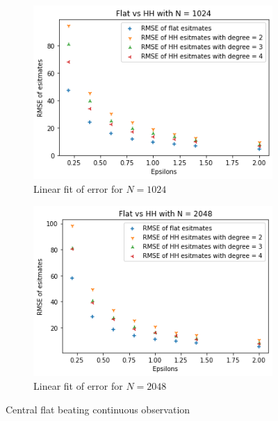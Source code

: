 \documentclass[11pt]{article}
\theoremstyle{definition}
\begin{document}
\begin{figure}[H]
\begin{subfigure}{.4\textwidth}
  \includegraphics[width=\linewidth]{figures/central_flat_hh/flat_beat_hh_N=1024.png}
  \caption{Linear fit of error for $N=1024$}
  \label{fig:14}
\end{subfigure}
\begin{subfigure}{.4\textwidth}
  \centering
  \includegraphics[width=\linewidth]{figures/central_flat_hh/flat_beat_hh_N=2048.png}
  \caption{Linear fit of error for $N=2048$}
  \label{fig:15}
\end{subfigure}
\caption{Central flat beating continuous observation}
\label{99}
\end{figure}
\end{document}
